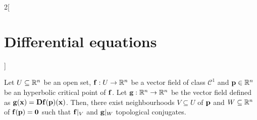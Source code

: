 \documentclass[../../../main.tex]{subfiles}
\begin{document}
\begin{multicols}{2}[\section{Differential equations}]
\begin{definition}
  \end{definition}
  \begin{theorem}
    Let $U\subseteq \mathbb{R}^n$ be an open set, $\boldsymbol{\mathrm{f}}:U\rightarrow\mathbb{R}^n$ be a vector field of class $\mathcal{C}^1$ and $\boldsymbol{\mathrm{p}}\in\mathbb{R}^n$ be an hyperbolic critical point of $\boldsymbol{\mathrm{f}}$. Let $\boldsymbol{\mathrm{g}}:\mathbb{R}^n\rightarrow\mathbb{R}^n$ be the vector field defined as $\boldsymbol{\mathrm{g}}(\boldsymbol{\mathrm{x}})=\boldsymbol{\mathrm{Df}}(\boldsymbol{\mathrm{p}})(\boldsymbol{\mathrm{x}})$. Then, there exist neighbourhoods $V\subseteq U$ of $\boldsymbol{\mathrm{p}}$ and $W\subseteq \mathbb{R}^n$ of $\boldsymbol{\mathrm{f}}(\boldsymbol{\mathrm{p}})=\boldsymbol{\mathrm{0}}$ such that $\boldsymbol{\mathrm{f}}|_V$ and $\boldsymbol{\mathrm{g}}|_W$ topological conjugates.
  \end{theorem}
\end{multicols}
\end{document}
